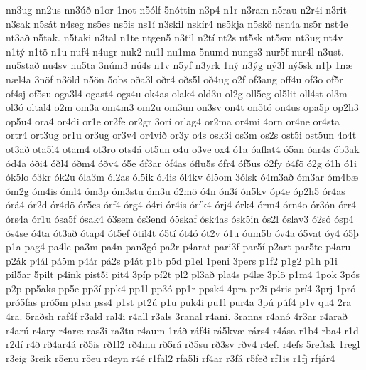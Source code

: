 {nn3ug
nn2us
nn3^^fa^^f0
n1or
1not
n5^^f3lf
5n^^f3ttin
n3p4
n1r
n3ram
n5rau
n2r4i
n3rit
n3sak
n5s^^e1t
n4seg
ns5es
ns5is
ns1^^ed
n3skil
nsk^^edr4
ns5kja
n5sk^^f6
nsn4a
ns5r
nst4e
nt3a^^f0
n5tak.
n5taki
n3tal
n1te
ntgen5
n3til
n2t^^ed
nt2s
nt5sk
nt5sm
nt3ug
nt4v
n1t^^fd
n1t^^f6
n1u
nuf4
n4ugr
nuk2
nu1l
nu1ma
5numd
nungs3
nur5f
nur4l
n3ust.
nu5sta^^f0
nu4sv
nu5ta
3n^^fam3
n^^fa4s
n1v
n5yf
n3yrk
1n^^fd
n3^^fdg
n^^fd3l
n^^fd5sk
n1^^fe
1n^^e6
n^^e6l4a
3n^^f6f
n3^^f6ld
n5^^f6n
5obs
o^^f0a3l
o^^f0r4
o^^f0s5l
o^^f04ug
o2f
of3ang
off4u
of3o
of5r
of4sj
of5su
oga3l4
ogast4
ogs4u
ok4as
olak4
old3u
ol2g
oll5eg
ol5lit
oll4st
ol3m
ol3^^f3
oltal4
o2m
om3a
om4m3
om2u
om3un
on3sv
on4t
on5t^^f3
on4us
opa5p
op2h3
op5u4
ora4
or4di
or1e
or2fe
or2gr
3or^^ed
orlag4
or2ma
or4mi
4orn
or4ne
or4sta
ortr4
ort3ug
or1u
or3ug
or3v4
or4vi^^f0
or3y
o4s
osk3i
os3m
os2s
ost5i
ost5un
4o4t
ot3a^^f0
ota5l4
otam4
ot3ro
ots4^^e1
ot5un
o4u
o3ve
ox4
^^f31a
^^f3aflat4
^^f35an
^^f3ar4s
^^f3b3ak
^^f3d4a
^^f3^^f0i4
^^f3^^f0l4
^^f3^^f0m4
^^f3^^f0v4
^^f35e
^^f3f3ar
^^f3f4as
^^f3flu5s
^^f3fr4
^^f3f5us
^^f32fy
^^f34f^^f6
^^f32g
^^f31h
^^f31i
^^f3k5lo
^^f33kr
^^f3k2u
^^f3la3m
^^f3l2as
^^f3l5ik
^^f3l4is
^^f3l4kv
^^f3l5om
3^^f3lsk
^^f34m3a^^f0
^^f3m3ar
^^f3m4b^^e6
^^f3m2g
^^f3m4is
^^f3ml4
^^f3m3p
^^f3m3stu
^^f3m3u
^^f32m^^f6
^^f34n
^^f3n3^^ed
^^f3n5kv
^^f3p4e
^^f3p2h5
^^f3r4as
^^f3r^^e14
^^f3r2d
^^f3r4d^^f6
^^f3r5es
^^f3rf4
^^f3rg4
^^f34ri
^^f3r4is
^^f3r^^edk4
^^f3rj4
^^f3rk4
^^f3rm4
^^f3rn4o
^^f3r3^^f3n
^^f3rr4
^^f3rs4a
^^f3r1u
^^f3sa5f
^^f3sak4
^^f33sem
^^f3s3end
^^f35skaf
^^f3sk4as
^^f3sk5in
^^f3s2l
^^f3slav3
^^f32s^^f3
^^f3sp4
^^f3s4se
^^f34ta
^^f3t3a^^f0
^^f3tap4
^^f3t5ef
^^f3til4t
^^f35t^^ed
^^f3t4^^f3
^^f3t2v
^^f31u
^^f3um5b
^^f3v4a
^^f35vat
^^f3y4
^^f35^^fe
p1a
pag4
pa4le
pa3m
pa4n
pan3g^^f3
pa2r
p4arat
pari3f
par5^^ed
p2art
par5te
p4aru
p2^^e1k
p4^^e1l
p^^e15m
p4^^e1r
p^^e12s
p4^^e1t
p1b
p5d
p1el
1peni
3pers
p1f2
p1g2
p1h
p1i
pil5ar
5pilt
p4ink
pist5i
pit4
3p^^edp
p^^ed2t
pl2
pl3a^^f0
pla4s
p4l^^e6
3pl^^f6
p1m4
1pok
3p^^f3s
p2p
pp5aks
pp5e
pp3^^ed
ppk4
pp1l
pp3^^f3
pp1r
ppsk4
4pra
pr2i
p4ris
pr^^ed4
3prj
1pr^^f3
pr^^f35fas
pr^^f35m
p1sa
pss4
p1st
pt2^^fa
p1u
puk4i
pu1l
pur4a
3p^^fa
p^^faf4
p1v
qu4
2ra
4ra.
5ra^^f0sh
raf4f
r3ald
ral4i
r4all
r3als
3ranal
r4ani.
3ranns
r4an^^f3
4r3ar
r4ara^^f0
r4ar^^fa
r4ary
r4ar^^e6
ras3i
ra3tu
r4aum
1r^^e1^^f0
r^^e1f4i
r^^e15kv^^e6
r^^e1rs4
r4^^e1sa
r1b4
rba4
r1d
r2d^^ed
r4^^f0
r^^f04ar4^^e1
r^^f05is
r^^f01l2
r^^f04mu
r^^f05r^^e1
r^^f05su
r^^f03sv
r^^f0v4
r4ef.
r4efs
5reftsk
1regl
r3eig
3reik
r5enu
r5eu
r4eyn
r4^^e9
r1fal2
rfa5li
rf4ar
r3f^^e1
r5fe^^f0
rf1is
r1fj
rfj^^e1r4
}
